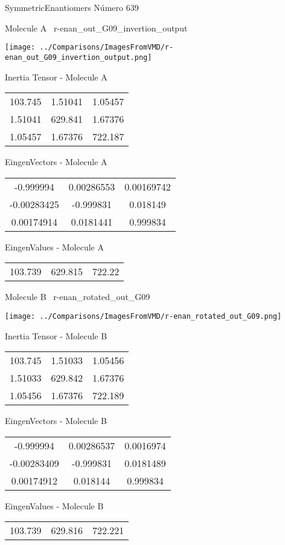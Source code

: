 \vtab[-3cm]
\begin{center}
{\large SymmetricEnantiomers \tab Número 639}
\end{center}
\begin{multicols}{2}
\begin{center}

Molecule A \
r-enan\_out\_G09\_invertion\_output

\texttt{[image: ../Comparisons/ImagesFromVMD/r-enan\_out\_G09\_invertion\_output.png]}

Inertia Tensor - Molecule A \\
\begin{tabular}{|c c c|}
103.745	 & 	1.51041	 & 	1.05457	 \\
1.51041	 & 	629.841	 & 	1.67376	 \\
1.05457	 & 	1.67376	 & 	722.187
\end{tabular}

\vtab
 EingenVectors - Molecule A     \\
\begin{tabular}{|c c c|}
-0.999994	 & 	0.00286553	 & 	0.00169742	 \\
-0.00283425	 & 	-0.999831	 & 	0.018149	 \\
0.00174914	 & 	0.0181441	 & 	0.999834
\end{tabular}

\vtab
 EingenValues - Molecule A     \\
\begin{tabular}{|c c c|}
103.739	 & 	629.815	 & 	722.22	 \\
\end{tabular}
\columnbreak

Molecule B \
r-enan\_rotated\_out\_G09

\texttt{[image: ../Comparisons/ImagesFromVMD/r-enan\_rotated\_out\_G09.png]}

Inertia Tensor - Molecule B \\
\begin{tabular}{|c c c|}
103.745	 & 	1.51033	 & 	1.05456	 \\
1.51033	 & 	629.842	 & 	1.67376	 \\
1.05456	 & 	1.67376	 & 	722.189
\end{tabular}

\vtab
 EingenVectors - Molecule B     \\
\begin{tabular}{|c c c|}
-0.999994	 & 	0.00286537	 & 	0.0016974	 \\
-0.00283409	 & 	-0.999831	 & 	0.0181489	 \\
0.00174912	 & 	0.018144	 & 	0.999834
\end{tabular}

\vtab
 EingenValues - Molecule B     \\
\begin{tabular}{|c c c|}
103.739	 & 	629.816	 & 	722.221	 \\
\end{tabular}

\end{center}
\end{multicols}


